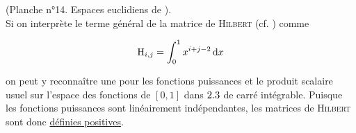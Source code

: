 (Planche n°14. Espaces euclidiens de \cite{maths-france}). \\
Si on interprète le terme général de la matrice de \textsc{Hilbert} (cf. ) comme 
 
$$\mathrm{H}_{i,j} = \int_{0}^{1} x^{i+j-2} \, \mathrm{d} x$$

on peut y reconnaître une  pour les fonctions puissances et le produit scalaire usuel sur l'espace des fonctions de $[0, 1]$ dans $2.3$ de carré intégrable. Puisque les fonctions puissances sont linéairement indépendantes, les matrices de \textsc{Hilbert} sont donc
\href{https://fr.wikipedia.org/wiki/Matrice_de_Hilbert}{définies positives}.
